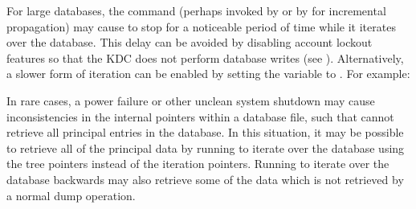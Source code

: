 \documentclass[letterpaper,10pt,english]{sphinxmanual}
\begin{document}
For large databases, the {\hyperref[\detokenize{admin/admin_commands/kdb5_util:kdb5-util-8}]{}}  command (perhaps
invoked by {\hyperref[\detokenize{admin/admin_commands/kprop:kprop-8}]{}} or by {\hyperref[\detokenize{admin/admin_commands/kadmind:kadmind-8}]{}} for incremental
propagation) may cause {\hyperref[\detokenize{admin/admin_commands/krb5kdc:krb5kdc-8}]{}} to stop for a noticeable
period of time while it iterates over the database.  This delay can be
avoided by disabling account lockout features so that the KDC does not
perform database writes (see {\hyperref[\detokenize{admin/lockout:disable-lockout}]{}}).  Alternatively,
a slower form of iteration can be enabled by setting the
 variable to .  For example:

%
\begin{sphinxVerbatim}[commandchars=\\\{\}]
\PYG{p}{[}\PYG{p}{]}
      
          
          
\end{sphinxVerbatim}

In rare cases, a power failure or other unclean system shutdown may
cause inconsistencies in the internal pointers within a database file,
such that  cannot retrieve all principal entries in
the database.  In this situation, it may be possible to retrieve all
of the principal data by running  to
iterate over the database using the tree pointers instead of the
iteration pointers.  Running  to iterate over
the database backwards may also retrieve some of the data which is not
retrieved by a normal dump operation.
\end{document}
